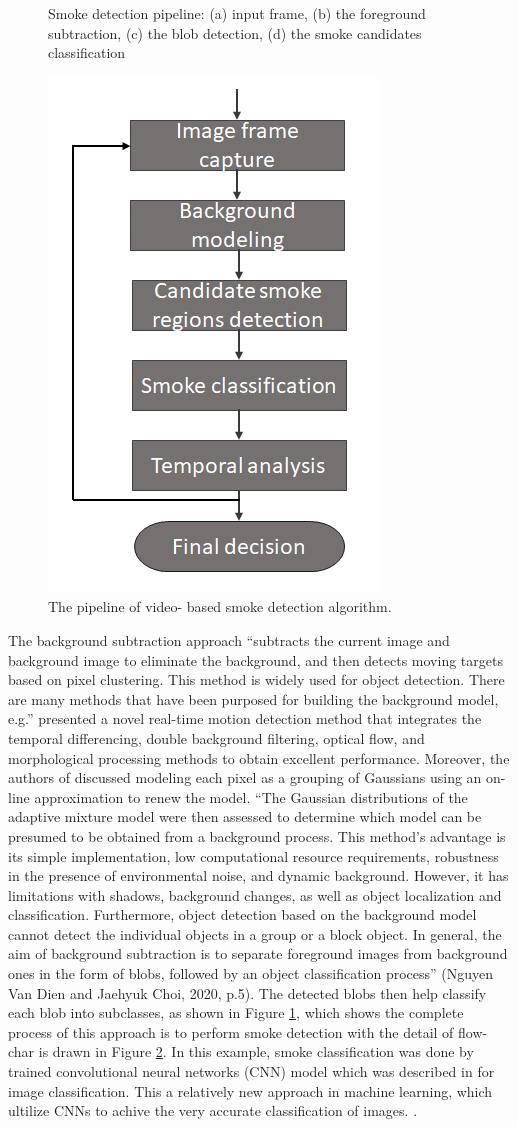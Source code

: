 \begin{figure}
{}
\caption{Smoke detection pipeline: (a) input frame, (b) the foreground subtraction, (c) the blob detection, (d) the smoke candidates classification }
\label{fig:bgmethod}
\end{figure}
\begin{figure}
\centering
 \includegraphics[width=0.3\linewidth]{Figures/smoke.jpg}
 \caption{The pipeline of video- based smoke detection algorithm.}
 \label{fig:smoke}
\end{figure}
The background subtraction approach \cite{lee2012adaptive}\cite{stauffer1999adaptive} “subtracts the current image and background image to eliminate the background, and then detects moving targets based on pixel clustering. This method is widely used for object detection. There are many methods that have been purposed for building the background model, e.g.”  \cite{lu2008improved} presented a novel real-time motion detection method that integrates the temporal differencing, double background filtering, optical flow, and morphological processing methods to obtain excellent performance. Moreover, the authors of \cite{stauffer1999adaptive} discussed modeling each pixel as a grouping of Gaussians using an on-line approximation to renew the model. “The Gaussian distributions of the adaptive mixture model were then assessed to determine which model can be presumed to be obtained from a background process. This method’s advantage is its simple implementation, low computational resource requirements, robustness in the presence of environmental noise, and dynamic background. However, it has limitations with shadows, background changes, as well as object localization and classification. Furthermore, object detection based on the background model cannot detect the individual objects in a group or a block object. In general, the aim of background subtraction is to separate foreground images from background ones in the form of blobs, followed by an object classification process” (Nguyen Van Dien and Jaehyuk Choi, 2020, p.5). The detected blobs then help classify each blob into subclasses, as shown in Figure \ref{fig:bgmethod}, which shows the complete process of this approach is to perform smoke detection with the detail of flow-char is drawn in Figure \ref{fig:smoke}. In this example, smoke classification was done by trained convolutional neural networks (CNN) model which was described in \cite{krizhevsky2017imagenet} for image classification. This a relatively new approach in machine learning, which ultilize CNNs to achive the very accurate classification of images. \cite{lecun2010convolutional}\cite{jarrett2009best}\cite{lee2009convolutional}. 

